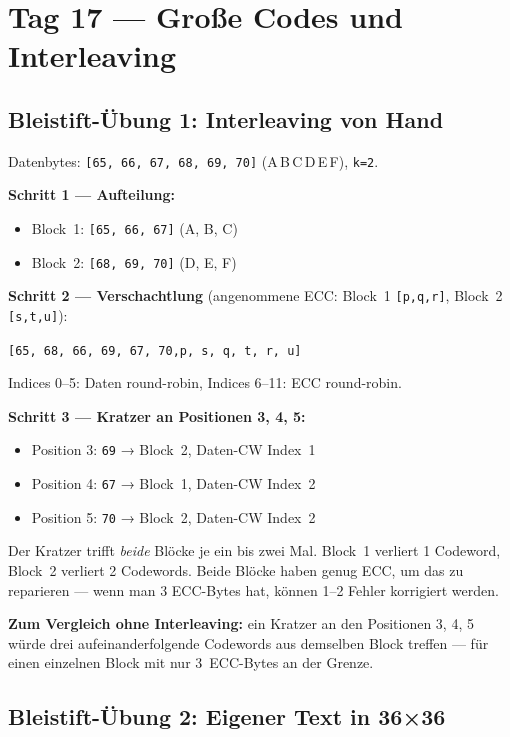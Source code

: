 \section*{Tag 17 — Große Codes und Interleaving}

\subsection*{Bleistift-Übung 1: Interleaving von Hand}

Datenbytes: \texttt{[65, 66, 67, 68, 69, 70]} (A\,B\,C\,D\,E\,F),
\texttt{k=2}.

\textbf{Schritt 1 — Aufteilung:}
\begin{itemize}
\item Block~1: \texttt{[65, 66, 67]}  (A, B, C)
\item Block~2: \texttt{[68, 69, 70]}  (D, E, F)
\end{itemize}

\textbf{Schritt 2 — Verschachtlung}
(angenommene ECC: Block~1 \texttt{[p,q,r]}, Block~2 \texttt{[s,t,u]}):

\begin{center}
\texttt{[65, 68, 66, 69, 67, 70,\quad p, s, q, t, r, u]}
\end{center}

Indices 0–5: Daten round-robin, Indices 6–11: ECC round-robin.

\textbf{Schritt 3 — Kratzer an Positionen 3, 4, 5:}
\begin{itemize}
\item Position 3: \texttt{69} → Block~2, Daten-CW Index~1
\item Position 4: \texttt{67} → Block~1, Daten-CW Index~2
\item Position 5: \texttt{70} → Block~2, Daten-CW Index~2
\end{itemize}

Der Kratzer trifft \emph{beide} Blöcke je ein bis zwei Mal. Block~1
verliert 1 Codeword, Block~2 verliert 2 Codewords. Beide Blöcke haben
genug ECC, um das zu reparieren — wenn man 3 ECC-Bytes hat, können
1–2 Fehler korrigiert werden.

\textbf{Zum Vergleich ohne Interleaving:} ein Kratzer an den Positionen
3, 4, 5 würde drei aufeinander­folgende Codewords aus demselben Block
treffen — für einen einzelnen Block mit nur 3~ECC-Bytes an der Grenze.

\subsection*{Bleistift-Übung 2: Eigener Text in 36×36}

